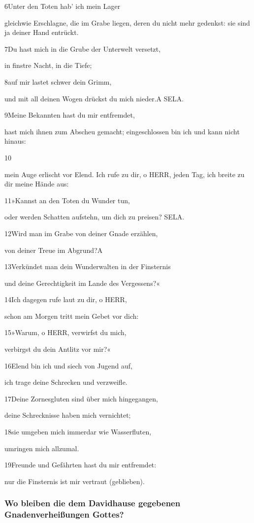 6Unter den Toten hab' ich mein Lager

gleichwie Erschlagne, die im Grabe liegen, deren du nicht mehr gedenkst:
sie sind ja deiner Hand entrückt.

7Du hast mich in die Grube der Unterwelt versetzt,

in finstre Nacht, in die Tiefe;

8auf mir lastet schwer dein Grimm,

und mit all deinen Wogen drückst du mich nieder.{A} SELA.

9Meine Bekannten hast du mir entfremdet,

hast mich ihnen zum Abscheu gemacht; eingeschlossen bin ich und kann
nicht hinaus:

10

mein Auge erlischt vor Elend. Ich rufe zu dir, o HERR, jeden Tag, ich
breite zu dir meine Hände aus:

11»Kannst an den Toten du Wunder tun,

oder werden Schatten aufstehn, um dich zu preisen? SELA.

12Wird man im Grabe von deiner Gnade erzählen,

von deiner Treue im Abgrund?{A}

13Verkündet man dein Wunderwalten in der Finsternis

und deine Gerechtigkeit im Lande des Vergessens?«

14Ich dagegen rufe laut zu dir, o HERR,

schon am Morgen tritt mein Gebet vor dich:

15»Warum, o HERR, verwirfst du mich,

verbirgst du dein Antlitz vor mir?«

16Elend bin ich und siech von Jugend auf,

ich trage deine Schrecken und verzweifle.

17Deine Zornesgluten sind über mich hingegangen,

deine Schrecknisse haben mich vernichtet;

18sie umgeben mich immerdar wie Wasserfluten,

umringen mich allzumal.

19Freunde und Gefährten hast du mir entfremdet:

nur die Finsternis ist mir vertraut (geblieben).

\hypertarget{wo-bleiben-die-dem-davidhause-gegebenen-gnadenverheiuxdfungen-gottes}{%
\subsubsection{Wo bleiben die dem Davidhause gegebenen
Gnadenverheißungen
Gottes?}\label{wo-bleiben-die-dem-davidhause-gegebenen-gnadenverheiuxdfungen-gottes}}

